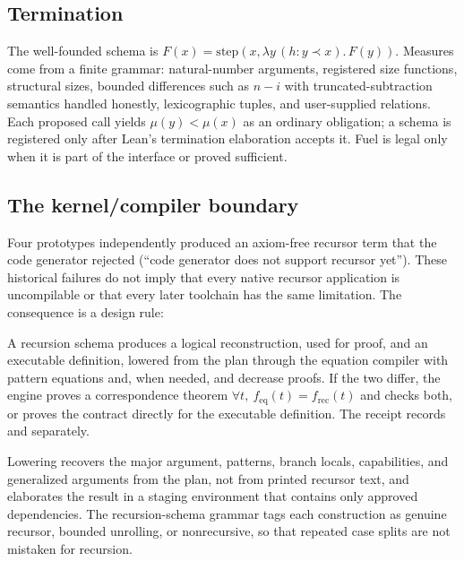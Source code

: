 \subsection{Termination}

The well-founded schema is $F(x) = \mathrm{step}(x, \lambda y\,(h : y \prec x).\,F(y))$. Measures come from a finite grammar: natural-number arguments, registered size functions, structural sizes, bounded differences such as $n - i$ with truncated-subtraction semantics handled honestly, lexicographic tuples, and user-supplied relations. Each proposed call yields $\mu(y) < \mu(x)$ as an ordinary obligation; a schema is registered only after Lean's termination elaboration accepts it. Fuel is legal only when it is part of the interface or proved sufficient.

\subsection{The kernel/compiler boundary}\label{sec:lowering}

Four prototypes independently produced an axiom-free recursor term that the code generator rejected (``code generator does not support recursor  yet''). These historical failures do not imply that every native recursor application is uncompilable or that every later toolchain has the same limitation. The consequence is a design rule:

\begin{invariant}\label{inv:lowering}
A recursion schema produces a logical reconstruction, used for proof, and an executable definition, lowered from the plan through the equation compiler with pattern equations and, when needed,  and decrease proofs. If the two differ, the engine proves a correspondence theorem $\forall t,\ f_{\mathrm{eq}}(t) = f_{\mathrm{rec}}(t)$ and checks both, or proves the contract directly for the executable definition. The receipt records  and  separately.
\end{invariant}

Lowering recovers the major argument, patterns, branch locals, capabilities, and generalized arguments from the plan, not from printed recursor text, and elaborates the result in a staging environment that contains only approved dependencies. The recursion-schema grammar tags each construction as genuine recursor, bounded unrolling, or nonrecursive, so that repeated case splits are not mistaken for recursion.

